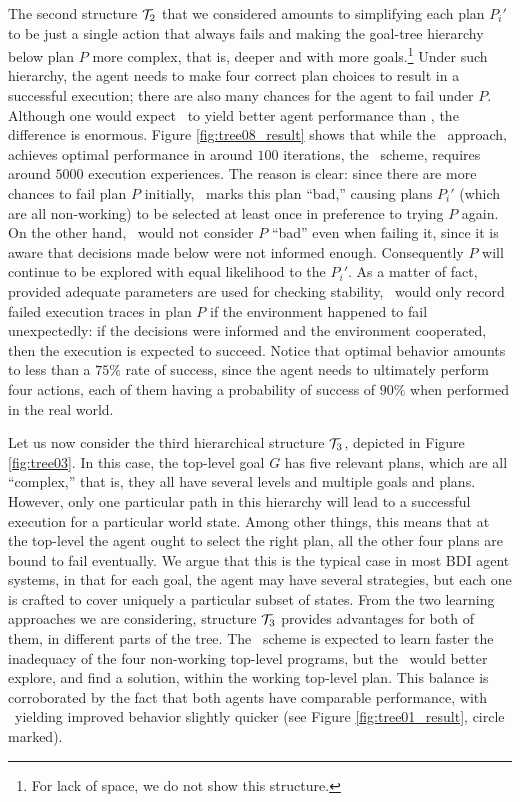 The second structure ${\mathcal{T}}_2$ that we considered amounts to simplifying
each plan $P_i'$ to be just a single action that always fails and
making the goal-tree hierarchy below plan $P$ more complex, that is,
deeper and with more goals.\footnote{For lack of space, we do not show
this structure.}
%
Under such hierarchy, the agent needs to make four correct plan
choices to result in a successful execution; there are also many
chances for the agent to fail under $P$.
%
Although one would expect \BUL\ to yield better agent performance than
\CL, the difference is enormous. Figure \ref{fig:tree08_result} shows
that while the \BUL\ approach, achieves optimal performance in around
$100$ iterations, the \CL\ scheme, requires around $5000$ execution
experiences.  
%
The reason is clear: since there are more chances to fail plan $P$
initially, \CL\ marks this plan ``bad,'' causing plans $P_i'$ (which
are all non-working) to be selected at least once in preference to
trying $P$ again. On the other hand, \BUL\ would not consider $P$
``bad'' even when failing it, since it is aware that decisions made 
below were not informed enough. Consequently $P$ will continue to be
explored with equal likelihood to the $P_i'$.
%
As a matter of fact,
provided adequate parameters are used for checking stability, \BUL\
would only record failed execution traces in plan $P$ if the
environment happened to fail unexpectedly: if the decisions were
informed and the environment cooperated, then the execution is
expected to succeed. 
%
Notice that optimal behavior amounts to less than a $75\%$ rate of
success, since the agent needs to ultimately perform four actions,
each of them having a probability of success of $90\%$ when performed
in the real world. 

Let us now consider the third hierarchical structure ${\mathcal{T}}_3$, depicted
in Figure \ref{fig:tree03}. In this case, the top-level goal $G$ has
five relevant plans, which are all ``complex,'' that is, they all have
several levels and multiple goals and plans. However, only one
particular path in this hierarchy will lead to a successful 
execution for a particular world state. 
Among other things, this means that at the top-level the agent ought
to select the right plan, all the other four plans are bound to fail
eventually. 
%
We argue that this is the typical case in most BDI agent systems, in
that for each goal, the agent may have several strategies, but each
one is crafted to cover uniquely a particular subset of states.
%
From the two learning approaches we are considering, structure ${\mathcal{T}}_3$
provides advantages for both of them, in different parts of the
tree. The \CL\ scheme is expected to learn faster the inadequacy 
of the four non-working top-level programs, but the \BUL\ would better
explore, and find a solution, within the working top-level plan.
%
This balance is corroborated by the fact that both agents have
comparable performance, with \BUL\ yielding improved behavior slightly
quicker (see Figure \ref{fig:tree01_result}, circle marked). 

